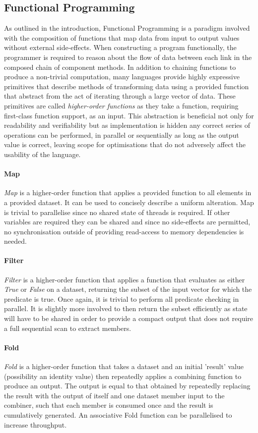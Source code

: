 \subsection{Functional Programming}
As outlined in the introduction, Functional Programming is a paradigm involved with the composition of functions that map data from input to output values without external side-effects. When constructing a program functionally, the programmer is required to reason about the flow of data between each link in the composed chain of component methods.
In addition to chaining functions to produce a non-trivial computation, many languages provide highly expressive primitives that describe methods of transforming data using a provided function that abstract from the act of iterating through a large vector of data.
These primitives are called \emph{higher-order functions} as they take a function, requiring first-class function support, as an input.
This abstraction is beneficial not only for readability and verifiability but as implementation is hidden any correct series of operations can be performed, in parallel or sequentially as long as the output value is correct, leaving scope for optimisations that do not adversely affect the usability of the language.
\paragraph{Map}
\emph{Map} is a higher-order function that applies a provided function to all elements in a provided dataset. It can be used to concisely describe a uniform alteration.
Map is trivial to parallelise since no shared state of threads is required.
If other variables are required they can be shared and since no side-effects are permitted, no synchronisation outside of providing read-access to memory dependencies is needed.
\paragraph{Filter}
\emph{Filter} is a higher-order function that applies a function that evaluates as either \emph{True} or \emph{False} on a dataset, returning the subset of the input vector for which the predicate is true. Once again, it is trivial to perform all predicate checking in parallel. It is slightly more involved to then return the subset efficiently as state will have to be shared in order to provide a compact output that does not require a full sequential scan to extract members.
\paragraph{Fold}
\emph{Fold} is a higher-order function that takes a dataset and an initial 'result' value (possibility an identity value) then repeatedly applies a combining function to produce an output. The output is equal to that obtained by repeatedly replacing the result with the output of itself and one dataset member input to the combiner, such that each member is consumed once and the result is cumulatively generated. An associative Fold function can be parallelised to increase throughput.
